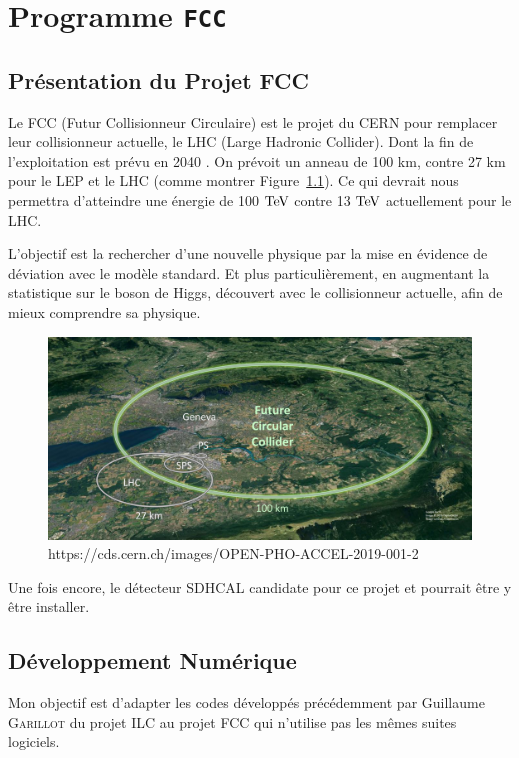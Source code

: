 \chapter{Programme \texttt{FCC}}

\section{Présentation du Projet FCC}

Le FCC (Futur Collisionneur Circulaire) est le projet du CERN pour remplacer 
leur collisionneur actuelle, le LHC (Large Hadronic Collider). 
Dont la fin de l'exploitation est prévu en 2040 \cite{cern:fcc}.
On prévoit un anneau de 100 km, contre 27 km pour le LEP et le LHC 
(comme montrer Figure~\ref{fcc:img}).
Ce qui devrait nous permettra d'atteindre une énergie de 100 $\mathrm{TeV}$ contre 13 $\mathrm{TeV}$
actuellement pour le LHC.

L'objectif est la rechercher d'une nouvelle physique par la mise en évidence de déviation avec le modèle standard. Et plus particulièrement, en augmentant la statistique sur le boson de Higgs, découvert avec le collisionneur actuelle, afin de mieux comprendre sa physique.

\begin{figure}[!ht]
    \centering
    \includegraphics[width=\textwidth]{../img/FCC.jpg}
    \caption{https://cds.cern.ch/images/OPEN-PHO-ACCEL-2019-001-2}
    \label{fcc:img}
\end{figure}

Une fois encore, le détecteur SDHCAL candidate pour ce projet et pourrait être y être installer.

\section{Développement Numérique}

Mon objectif est d'adapter les codes développés précédemment par Guillaume 
\textsc{Garillot} du projet ILC au projet FCC qui n'utilise pas les mêmes suites logiciels.


